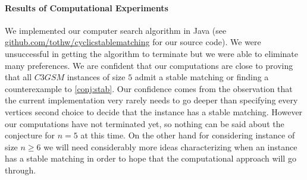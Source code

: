 \paragraph{Results of Computational Experiments}
We implemented our computer search algorithm in Java (see \href{https://github.com/tothw/cyclicstablematching}{github.com/tothw/cyclicstablematching} for our source code). We were unsuccessful in getting the algorithm to terminate but we were able to eliminate many preferences. We are confident that our computations are close to proving that all $C3GSM$ instances of size $5$ admit a stable matching or finding a counterexample to \ref{conj:stab}. Our confidence comes from the observation that the current implementation very rarely needs to go deeper than specifying every vertices second choice to decide that the instance has a stable matching. However our computations have not terminated yet, so nothing can be said about the conjecture for $n=5$ at this time. On the other hand for considering instance of size $n \geq 6$ we will need considerably more ideas characterizing when an instance has a stable matching in order to hope that the computational approach will go through.
